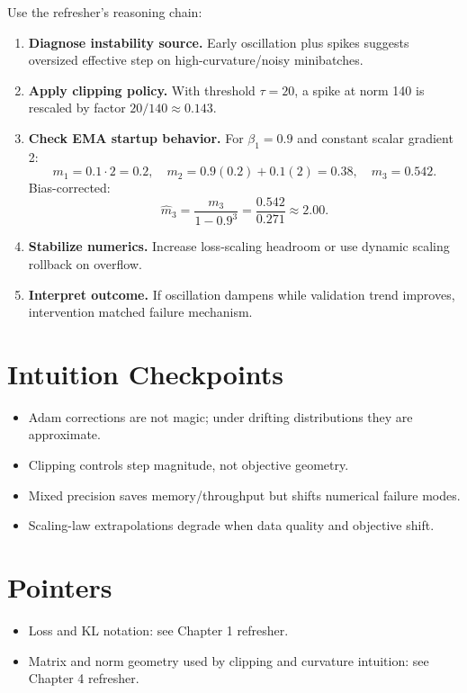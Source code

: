 Use the refresher's reasoning chain:
\begin{enumerate}[leftmargin=1.5em]
  \item \textbf{Diagnose instability source.} Early oscillation plus spikes suggests oversized effective step on high-curvature/noisy minibatches.
  \item \textbf{Apply clipping policy.} With threshold $\tau=20$, a spike at norm 140 is rescaled by factor $20/140\approx0.143$.
  \item \textbf{Check EMA startup behavior.} For $\beta_1=0.9$ and constant scalar gradient 2:
\[
m_1=0.1\cdot2=0.2,\quad m_2=0.9(0.2)+0.1(2)=0.38,\quad m_3=0.542.
\]
  Bias-corrected:
\[
\hat m_3=\frac{m_3}{1-0.9^3}=\frac{0.542}{0.271}\approx2.00.
\]
  \item \textbf{Stabilize numerics.} Increase loss-scaling headroom or use dynamic scaling rollback on overflow.
  \item \textbf{Interpret outcome.} If oscillation dampens while validation trend improves, intervention matched failure mechanism.
\end{enumerate}

\section*{Intuition Checkpoints}
\begin{itemize}[leftmargin=1.5em]
  \item Adam corrections are not magic; under drifting distributions they are approximate.
  \item Clipping controls step magnitude, not objective geometry.
  \item Mixed precision saves memory/throughput but shifts numerical failure modes.
  \item Scaling-law extrapolations degrade when data quality and objective shift.
\end{itemize}

\section*{Pointers}
\begin{itemize}[leftmargin=1.5em]
  \item Loss and KL notation: see Chapter 1 refresher.
  \item Matrix and norm geometry used by clipping and curvature intuition: see Chapter 4 refresher.
\end{itemize}

